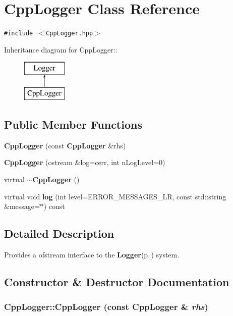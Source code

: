 \section{Cpp\-Logger Class Reference}
\label{classCppLogger}
{\tt \#include $<$Cpp\-Logger.hpp$>$}

Inheritance diagram for Cpp\-Logger::\begin{figure}[H]
\begin{center}
\leavevmode
\includegraphics[height=2cm]{classCppLogger}
\end{center}
\end{figure}
\subsection*{Public Member Functions}
\begin{CompactItemize}
\item 
{\bf Cpp\-Logger} (const {\bf Cpp\-Logger} \&rhs)
\item 
{\bf Cpp\-Logger} (ostream \&log=cerr, int n\-Log\-Level=0)\label{classCppLogger_a1}

\item 
virtual {\bf $\sim$Cpp\-Logger} ()
\item 
virtual void {\bf log} (int level=ERROR\_\-MESSAGES\_\-LR, const std::string \&message=\char`\"{}\char`\"{}) const 
\end{CompactItemize}


\subsection{Detailed Description}
Provides a ofstream interface to the {\bf Logger}{\rm (p.\,\pageref{classLogger})} system.



\subsection{Constructor \& Destructor Documentation}
\subsubsection{\setlength{\rightskip}{0pt plus 5cm}Cpp\-Logger::Cpp\-Logger (const {\bf Cpp\-Logger} \& {\em rhs})\hspace{0.3cm}{\tt  [inline]}}\label{classCppLogger_a0}


